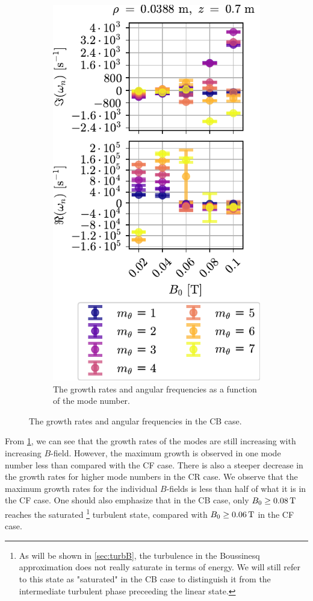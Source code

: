 \begin{figure}[htbp]
\begin{subfigure}[h]{0.45\textwidth}
        \includegraphics{fig/results/compareBouss/growthRatesB0Bous}
        \caption{The growth rates and angular frequencies as a function of the mode number.}
        \label{fig:GRBM}
    \end{subfigure}%
    \caption{The growth rates and angular frequencies in the CB case.}
    \label{fig:GRB}
\end{figure}
%
From \cref{fig:GRBM}, we can see that the growth rates of the modes are still increasing with increasing $B$-field.
However, the maximum growth is observed in one mode number less than compared with the CF case.
There is also a steeper decrease in the growth rates for higher mode numbers in the CR case.
We observe that the maximum growth rates for the individual $B$-fields is less than half of what it is in the CF case.
One should also emphasize that in the CB case, only $B_0 \geq 0.08\, \text{T}$ reaches the saturated%
\footnote{As will be shown in \cref{sec:turbB}, the turbulence in the Boussinesq approximation does not really saturate in terms of energy.
    We will still refer to this state as "saturated" in the CB case to distinguish it from the intermediate turbulent phase preceeding the linear state.
} %
%
turbulent state, compared with $B_0 \geq 0.06\, \text{T}$ in the CF case.

